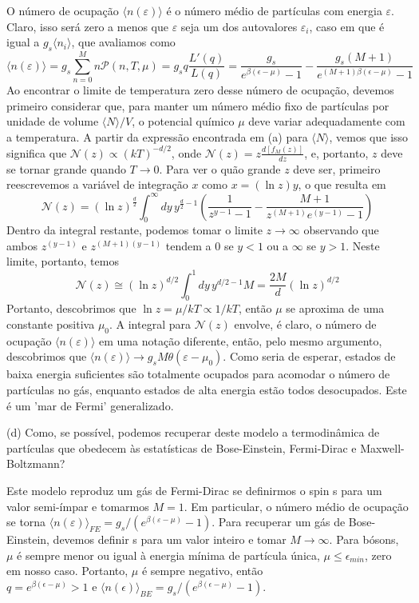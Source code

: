 \documentclass[12pt]{article}
\begin{document}
O número de ocupação $\langle n(\varepsilon) \rangle$ é o número médio de partículas com energia $\varepsilon$. Claro, isso será zero a menos que $\varepsilon$ seja um dos autovalores $\varepsilon_i$, caso em que é igual a $g_s \langle n_i \rangle$, que avaliamos como 
\[
\langle n(\varepsilon) \rangle = g_s \sum_{n=0}^M n \mathcal{P}(n, T, \mu) = g_s q \frac{L'(q)}{L(q)} = \frac{g_s}{e^{\beta(\epsilon - \mu)} - 1} - \frac{g_s(M+1)}{e^{(M+1)\beta(\epsilon - \mu)} - 1}
\]
Ao encontrar o limite de temperatura zero desse número de ocupação, devemos primeiro considerar que, para manter um número médio fixo de partículas por unidade de volume $\langle N \rangle/V$, o potencial químico $\mu$ deve variar adequadamente com a temperatura. A partir da expressão encontrada em (a) para $\langle N \rangle$, vemos que isso significa que $\mathcal{N}(z) \propto (kT)^{-d/2}$, onde $ \mathcal{N}(z) = z \frac{d[f_M(z)]}{dz}$, e, portanto, $z$ deve se tornar grande quando $T \rightarrow 0$. Para ver o quão grande $z$ deve ser, primeiro reescrevemos a variável de integração $x$ como $x = (\ln z) y$, o que resulta em 
\[
\mathcal{N}(z) = (\ln z)^{\frac{d}{2}} \int_0^\infty dy \, y^{\frac{d}{2} - 1} \left( \frac{1}{z^{y-1} - 1} - \frac{M+1}{z^{(M+1)} e^{(y-1)} - 1} \right)
\]
Dentro da integral restante, podemos tomar o limite $z \rightarrow \infty$ observando que ambos $z^{(y-1)}$ e $z^{(M+1)(y-1)}$ tendem a 0 se $y < 1$ ou a $\infty$ se $y > 1$. Neste limite, portanto, temos 
\[
\mathcal{N}(z) \cong (\ln z)^{d/2} \int_0^1 dy \, y^{d/2 - 1} M = \frac{2M}{d} (\ln z)^{d/2}
\]
Portanto, descobrimos que $ \ln z = \mu/kT \propto 1/kT$, então $\mu$ se aproxima de uma constante positiva $\mu_0$. A integral para $\mathcal{N}(z)$ envolve, é claro, o número de ocupação $\langle n(\varepsilon) \rangle$ em uma notação diferente, então, pelo mesmo argumento, descobrimos que $\langle n(\varepsilon) \rangle \rightarrow  g_s M\theta  (\varepsilon - \mu_0)$. Como seria de esperar, estados de baixa energia suficientes são totalmente ocupados para acomodar o número de partículas no gás, enquanto estados de alta energia estão todos desocupados. Este é um 'mar de Fermi' generalizado. 

(d) Como, se possível, podemos recuperar deste modelo a termodinâmica de partículas que obedecem às estatísticas de Bose-Einstein, Fermi-Dirac e Maxwell-Boltzmann?

Este modelo reproduz um gás de Fermi-Dirac se definirmos o spin s para um valor semi-ímpar e tomarmos $M = 1$. Em particular, o número médio de ocupação se torna $\langle n(\varepsilon) \rangle_{FE} = g_{s} /(e^{\beta (\varepsilon - \mu)} - 1)$. Para recuperar um gás de Bose-Einstein, devemos definir s para um valor inteiro e tomar $M \rightarrow \infty$. Para bósons, $\mu$ é sempre menor ou igual à energia mínima de partícula única, $\mu \leq \epsilon_{min}$, zero em nosso caso. Portanto, $\mu$ é sempre negativo, então $q = e^{\beta (\epsilon - \mu)} > 1 \text{ e } \langle n(\epsilon) \rangle_{BE} = g_{s} /(e^{\beta (\epsilon - \mu)} - 1)$. 
\end{document}
